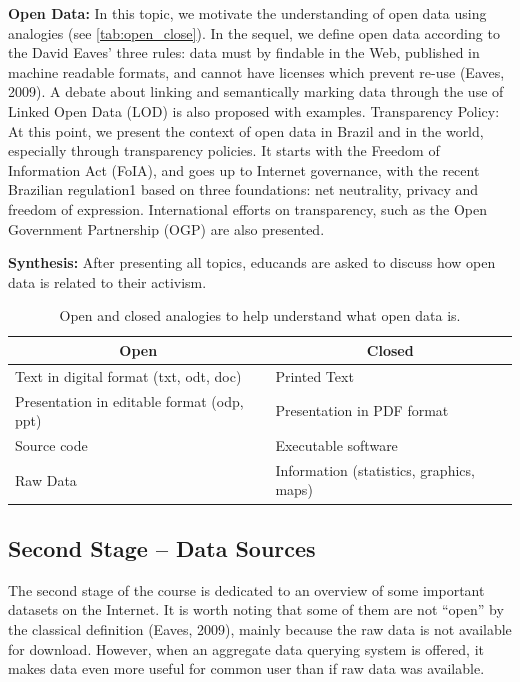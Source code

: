 \noindent \textbf{Open Data:} In this topic, we motivate the understanding of open data using analogies (see \autoref{tab:open_close}). In the sequel, we define open data according to the David Eaves' three rules: data must by findable in the Web, published in machine readable formats, and cannot have licenses which prevent re-use (Eaves, 2009). A debate about linking and semantically marking data through the use of Linked Open Data (LOD) is also proposed with examples.
Transparency Policy: At this point, we present the context of open data in Brazil and in the world, especially through transparency policies. It starts with the Freedom of Information Act (FoIA), and goes up to Internet governance, with the recent Brazilian regulation1 based on three foundations: net neutrality, privacy and freedom of expression. International efforts on transparency, such as the Open Government Partnership (OGP) are also presented.

\noindent \textbf{Synthesis:} After presenting all topics, educands are asked to discuss how open data is related to their activism.

\begin{table}[]
\centering
\ABNTEXfontereduzida
\caption{Open and closed analogies to help understand what open data is.}
\label{tab:open_close}
\begin{tabular}{|l|l|}
\hline
\multicolumn{1}{|c|}{\textbf{Open}}        & \multicolumn{1}{c|}{\textbf{Closed}}           \\ \hline
Text in digital format (txt, odt, doc)     & Printed Text                                   \\ \hline
Presentation in editable format (odp, ppt) & Presentation in PDF format \\ \hline
Source code                                & Executable software                            \\ \hline
Raw Data                                   & Information (statistics, graphics, maps)       \\ \hline
\end{tabular}
\end{table}

\subsection{Second Stage – Data Sources}

The second stage of the course is dedicated to an overview of some important datasets on the Internet. It is worth noting that some of them are not “open” by the classical definition (Eaves, 2009), mainly because the raw data is not available for download. However, when an aggregate data querying system is offered, it makes data even more useful for common user than if raw data was available.

